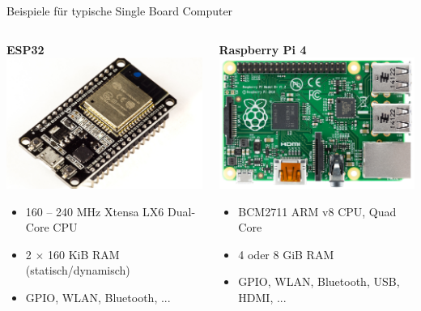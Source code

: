 {\begin{frame}{Beispiele für typische Single Board Computer}
    \bigskip

    \begin{columns}
        \begin{column}[b]{.5\textwidth}
            \textbf{ESP32} \\
            \smallskip
            \includegraphics[width=.5\textwidth]{img/sbc-esp32}

            \begin{itemize}
                \setlength{\itemindent}{-1em}
                \setlength\itemsep{0em}
                \item 160 -- 240 MHz Xtensa LX6 Dual-Core CPU
                \item 2 $\times$ 160 KiB RAM (statisch/dynamisch)
                \item GPIO, WLAN, Bluetooth, ...
            \end{itemize}
        \end{column}

        \begin{column}[b]{.5\textwidth}
            \textbf{Raspberry Pi 4} \\
            \smallskip
            \includegraphics[width=.5\textwidth]{img/sbc-raspberrypi.png}

            \begin{itemize}
                \setlength{\itemindent}{-1em}
                \setlength\itemsep{0em}
                \item BCM2711 ARM v8 CPU, Quad Core
                \item 4 oder 8 GiB RAM
                \item GPIO, WLAN, Bluetooth, USB, HDMI, ...
            \end{itemize}
        \end{column}
    \end{columns}
\end{frame}
}

